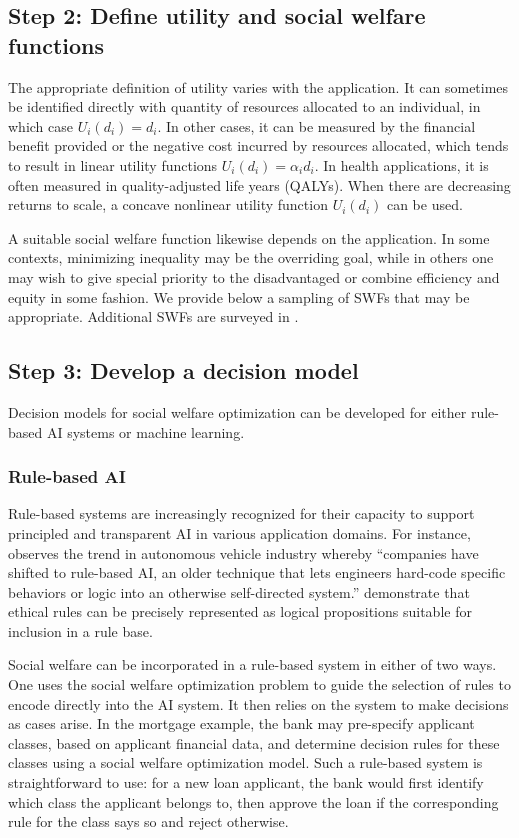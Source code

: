 \documentclass{article}[11pt]
\begin{document}
\subsection*{Step 2: Define utility and social welfare functions}

The appropriate definition of utility varies with the application.  It can sometimes be identified directly with quantity of resources allocated to an individual, in which case $U_i(d_i)=d_i$.  In other cases, it can be measured by the financial benefit provided or the negative cost incurred by resources allocated, which tends to result in linear utility functions $U_i(d_i)=\alpha_i d_i$.   In health applications, it is often measured  in quality-adjusted life years (QALYs).   When there are decreasing returns to scale, a concave nonlinear utility function $U_i(d_i)$ can be used. 

A suitable social welfare function likewise depends on the application.  In some contexts, minimizing inequality may be the overriding goal, while in others one may wish to give special priority to the disadvantaged or combine efficiency and equity in some fashion.  We provide below a sampling of SWFs that may be appropriate.  Additional SWFs are surveyed in \cite{CheHoo22}. 


\subsection*{Step 3: Develop a decision model} \label{sec:step3}

Decision models for social welfare optimization can be developed for either rule-based AI systems or machine learning. 


\subsubsection*{Rule-based AI}
Rule-based systems are increasingly recognized for their \mbox{capacity} to support principled and transparent AI in various application domains.  For instance, \cite{Brandom2018} observes the trend in autonomous vehicle industry whereby ``companies have shifted to rule-based AI, an older technique that lets engineers hard-code specific behaviors or logic into an otherwise self-directed system.''   \cite{KimHooDon2021} demonstrate that ethical rules can be precisely represented as logical propositions suitable for inclusion in a rule base.  

Social welfare can be incorporated in a rule-based system in either of two ways.  One uses the social welfare optimization problem to guide the selection of rules to encode directly into the AI system.  It then relies on the system to make decisions as cases arise.
In the mortgage example, the bank may pre-specify applicant classes, based on applicant financial data, and determine decision rules for these classes using a social welfare optimization model. Such a rule-based system is straightforward to use: for a new loan applicant, the bank would first identify which class the applicant belongs to, then approve the loan if the corresponding rule for the class says so and reject otherwise. 
\end{document}
